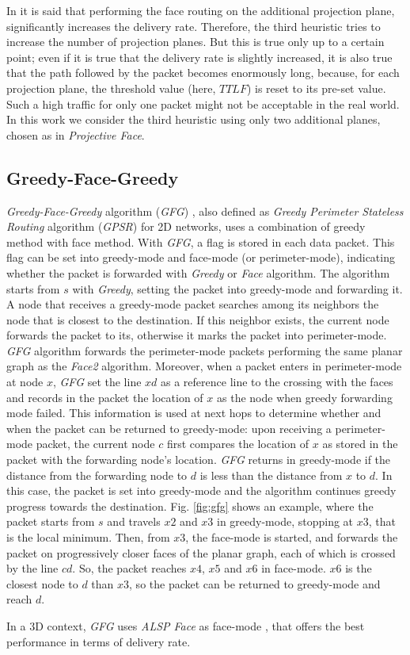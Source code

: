 \documentclass[journal,comsoc]{IEEEtran}
\begin{document}
In \cite{kao:nearly} it is said that performing the face routing on the additional projection plane, significantly increases the delivery rate. Therefore, the third heuristic tries to increase the number of projection planes. But this is true only up to a certain point; even if it is true that the delivery rate is slightly increased, it is also true that the path followed by the packet becomes enormously long, because, for each projection plane, the threshold value (here, \(TTLF\)) is reset to its pre-set value. Such a high traffic for only one packet might not be acceptable in the real world. In this work we consider the third heuristic using only two additional planes, chosen as in \emph{Projective Face}.


\subsection{Greedy-Face-Greedy}
\emph{Greedy-Face-Greedy} algorithm (\emph{GFG}) \cite{bose:gfg}, also defined as \emph{Greedy Perimeter Stateless Routing} algorithm (\emph{GPSR}) \cite{karp:gpsr} for 2D networks, uses a combination of greedy method with face method.
With \emph{GFG}, a flag is stored in each data packet. This flag can be set into greedy-mode and face-mode (or perimeter-mode), indicating whether the packet is forwarded with \emph{Greedy} or \emph{Face} algorithm. The algorithm starts from \(s\) with \emph{Greedy}, setting the packet into greedy-mode and forwarding it. A node that receives a greedy-mode packet searches among its neighbors the node that is closest to the destination. If this neighbor exists, the current node forwards the packet to its, otherwise it marks the packet into perimeter-mode.
\emph{GFG} algorithm forwards the perimeter-mode packets performing the same planar graph as the \emph{Face2} algorithm. Moreover, when a packet enters in perimeter-mode at node \(x\), \emph{GFG} set the line \(xd\) as a reference line to the crossing with the faces and records in the packet the location of \(x\) as the node when greedy forwarding mode failed. This information is used at next hops to determine whether and when the packet can be returned to greedy-mode: upon receiving a perimeter-mode packet, the current node \(c\) first compares the location of \(x\) as stored in the packet with the forwarding node's location. \emph{GFG} returns in greedy-mode if the distance from the forwarding node to \(d\) is less than the distance from \(x\) to \(d\). In this case, the packet is set into greedy-mode and the algorithm continues greedy progress towards the destination. Fig. \ref{fig:gfg} shows an example, where the packet starts from \(s\) and travels \(x2\) and \(x3\) in greedy-mode, stopping at \(x3\), that is the local minimum. Then, from \(x3\), the face-mode is started, and forwards the packet on progressively closer faces of the planar graph, each of which is crossed by the line \(cd\). So, the packet reaches \(x4\), \(x5\) and \(x6\) in face-mode. \(x6\) is the closest node to \(d\) than \(x3\), so the packet can be returned to greedy-mode and reach \(d\).
\par In a 3D context, \emph{GFG} uses \emph{ALSP Face} as face-mode \cite{liu:hybrid}, that offers the best performance in terms of delivery rate.
\end{document}
